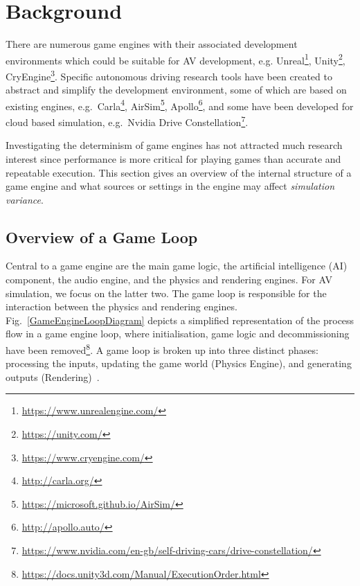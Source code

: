 \documentclass[letterpaper, 10 pt, journal, twoside]{IEEEtran}
\begin{document}
\section{Background} \label{s:background}

There are numerous game engines with their associated development environments which could be suitable for AV development, e.g. Unreal\footnote{\url{https://www.unrealengine.com/}}, Unity\footnote{\url{https://unity.com/}}, CryEngine\footnote{\url{https://www.cryengine.com/}}. Specific autonomous driving research tools have been created to abstract and simplify the development environment, some of which are based on existing engines, e.g.\ Carla\footnote{\url{http://carla.org/}}, AirSim\footnote{\url{https://microsoft.github.io/AirSim/}}, Apollo\footnote{\url{http://apollo.auto/}}, and some have been developed for cloud based simulation, e.g.\ Nvidia Drive Constellation\footnote{\url{https://www.nvidia.com/en-gb/self-driving-cars/drive-constellation/}}.

Investigating the determinism of game engines has not attracted much research interest since performance is more critical for playing games than accurate and repeatable execution. %
This section gives an overview of the internal structure of a game engine and what sources or settings in the engine may affect \textit{simulation variance}.
%

\subsection{Overview of a Game Loop} \label{GameLoopSection}

Central to a game engine are the main game logic, the artificial intelligence (AI) component, the audio engine, and the physics and rendering engines. For AV simulation, we focus on the latter two.
%
The game loop is responsible for the interaction between the physics and rendering engines. Fig.~\ref{GameEngineLoopDiagram} depicts a simplified representation of the process flow in a game engine loop, where  initialisation, game logic and decommissioning have been removed\footnote{\url{https://docs.unity3d.com/Manual/ExecutionOrder.html}}. A game loop is broken up into three distinct phases: processing the inputs, updating the game world (Physics Engine), and generating outputs (Rendering)~\cite{GameEngineArchBook}.
\end{document}
